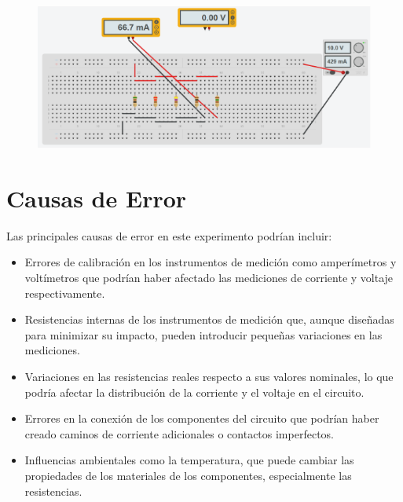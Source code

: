 \begin{figure}[H]
\begin{minipage}{0.45\textwidth}
      \label{fig: Simulacion Conexion Paralelo IR4}
    \end{minipage}
    \hfill
    \begin{minipage}{0.45\textwidth}
      \centering
      \includegraphics[width=\textwidth]{Figures/1. Content/simulation/paraleloAR5.png}
      \label{fig: Simulacion Conexion Paralelo IR5}
    \end{minipage}
\end{figure}


\section{Causas de Error}
Las principales causas de error en este experimento podrían incluir:
\begin{itemize}
    \item Errores de calibración en los instrumentos de medición como amperímetros y voltímetros que podrían haber afectado las mediciones de corriente y voltaje respectivamente.
    \item Resistencias internas de los instrumentos de medición que, aunque diseñadas para minimizar su impacto, pueden introducir pequeñas variaciones en las mediciones.
    \item Variaciones en las resistencias reales respecto a sus valores nominales, lo que podría afectar la distribución de la corriente y el voltaje en el circuito.
    \item Errores en la conexión de los componentes del circuito que podrían haber creado caminos de corriente adicionales o contactos imperfectos.
    \item Influencias ambientales como la temperatura, que puede cambiar las propiedades de los materiales de los componentes, especialmente las resistencias.
\end{itemize}


